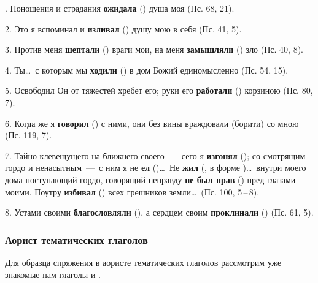 \documentclass[11pt,a4paper,oneside]{memoir}
\begin{document}
. Поношения и страдания \textbf{ожидала} ({}) душа моя
(Пс. 68, 21).

2. Это я вспоминал и \textbf{изливал} ({}) душу мою в
себя (Пс. 41, 5).

3. Против меня \textbf{шептали} ({}) враги мои, на меня
\textbf{замышляли} ({}) зло (Пс. 40, 8).

4. Ты\ldots~с которым мы \textbf{ходили} ({}) в дом
Божий единомысленно (Пс. 54, 15).

5. Освободил Он от тяжестей хребет его; руки его \textbf{работали}
({}) корзиною (Пс. 80, 7).

6. Когда же я \textbf{говорил} ({}) с ними, они без
вины враждовали (борити) со мною (Пс. 119, 7).

7. Тайно клевещущего на ближнего своего~---~сего я \textbf{изгонял}
({}); со смотрящим гордо и ненасытным~---~с ним я не
\textbf{ел} ({})\ldots~Не \textbf{жил} ({}, в
форме {})\ldots~внутри моего дома поступающий гордо,
говорящий неправду \textbf{не был прав} ({}) пред
глазами моими. Поутру \textbf{избивал} ({}) всех
грешников земли\ldots~(Пс. 100, 5\,--\,8).

8. Устами своими \textbf{благословляли} ({}), а
сердцем своим \textbf{проклинали} ({}) (Пс. 61, 5).

\subsubsection{Аорист тематических глаголов}

Для образца спряжения в аористе тематических глаголов рассмотрим уже
знакомые нам глаголы {} и {}.
\end{document}
